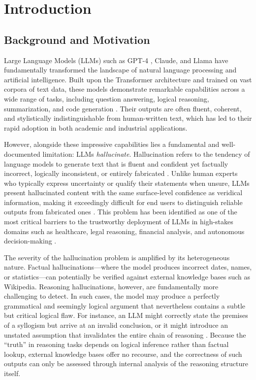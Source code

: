\chapter{Introduction}

\section{Background and Motivation}

Large Language Models (LLMs) such as GPT-4 \cite{openai2023gpt4}, Claude, and Llama have fundamentally transformed the landscape of natural language processing and artificial intelligence. Built upon the Transformer architecture \cite{vaswani2017attention} and trained on vast corpora of text data, these models demonstrate remarkable capabilities across a wide range of tasks, including question answering, logical reasoning, summarization, and code generation \cite{brown2020language}. Their outputs are often fluent, coherent, and stylistically indistinguishable from human-written text, which has led to their rapid adoption in both academic and industrial applications.

However, alongside these impressive capabilities lies a fundamental and well-documented limitation: LLMs \textit{hallucinate}. Hallucination refers to the tendency of language models to generate text that is fluent and confident yet factually incorrect, logically inconsistent, or entirely fabricated \cite{ji2023survey}. Unlike human experts who typically express uncertainty or qualify their statements when unsure, LLMs present hallucinated content with the same surface-level confidence as veridical information, making it exceedingly difficult for end users to distinguish reliable outputs from fabricated ones \cite{manakul2023selfcheckgpt}. This problem has been identified as one of the most critical barriers to the trustworthy deployment of LLMs in high-stakes domains such as healthcare, legal reasoning, financial analysis, and autonomous decision-making \cite{kaur2022trustworthy}.

The severity of the hallucination problem is amplified by its heterogeneous nature. Factual hallucinations---where the model produces incorrect dates, names, or statistics---can potentially be verified against external knowledge bases such as Wikipedia. Reasoning hallucinations, however, are fundamentally more challenging to detect. In such cases, the model may produce a perfectly grammatical and seemingly logical argument that nevertheless contains a subtle but critical logical flaw. For instance, an LLM might correctly state the premises of a syllogism but arrive at an invalid conclusion, or it might introduce an unstated assumption that invalidates the entire chain of reasoning \cite{liu2023evaluating}. Because the ``truth'' in reasoning tasks depends on logical inference rather than factual lookup, external knowledge bases offer no recourse, and the correctness of such outputs can only be assessed through internal analysis of the reasoning structure itself.

